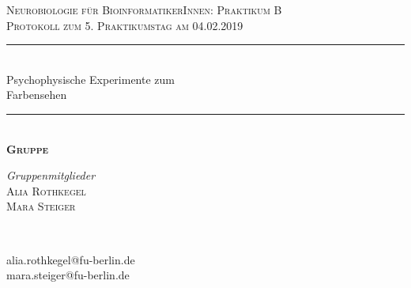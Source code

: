 \documentclass[11pt]{article}
\newcommand{\RM}[1]{\MakeUppercase{\romannumeral #1{}}}
\begin{document}
\begin{titlepage} %
	\newcommand{\HRule}{\rule{\linewidth}{0.5mm}} %
	
	\center %
	\vspace*{0.75cm}

	
	\textsc{\Large Neurobiologie für BioinformatikerInnen: Praktikum B}\\[0.65cm] %
	
	\textsc{\large Protokoll zum 5. Praktikumstag am 04.02.2019}\\[0.65cm] %

	\HRule\\[0.5cm]
	
	{\huge Psychophysische Experimente zum \\[0.2cm]Farbensehen}\\[0.3cm] %
	
	\HRule\\[0.75cm]
	\textsc{\Large\bfseries Gruppe \RM{4}}
	\\[0.8cm]
	
\vfill

	\begin{minipage}{0.45\textwidth}
		\begin{flushleft}
			\large
			\textit{Gruppenmitglieder}\\
			\textsc{Alia Rothkegel}\\
			\textsc{Mara Steiger}
		\end{flushleft}
	\end{minipage}
	~
	\begin{minipage}{0.45\textwidth}
		\begin{flushright}
			\large \vspace{16pt}
			alia.rothkegel@fu-berlin.de\\
			mara.steiger@fu-berlin.de 
		\end{flushright}
	\end{minipage}
	
\vfill


\end{titlepage}
\end{document}
